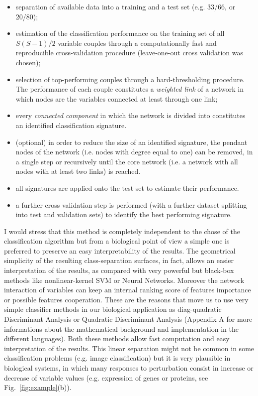 \documentclass{standalone}
\begin{document}
\begin{itemize}

\item separation of available data into a training and a test set (e.g. 33/66, or 20/80);

\item estimation of the classification performance on the training set of all $S(S-1)/2$ variable couples through a computationally fast and reproducible cross-validation procedure (leave-one-out cross validation was chosen);

\item selection of top-performing couples through a hard-thresholding procedure.
The performance of each couple constitutes a \emph{weighted link} of a network in which nodes are the variables connected at least through one link;

\item every \emph{connected component} in which the network is divided into constitutes an identified classification signature.

\item (optional) in order to reduce the size of an identified signature, the pendant nodes of the network (i.e. nodes with degree equal to one) can be removed, in a single step or recursively until the core network (i.e. a network with all nodes with at least two links) is reached.

\item all signatures are applied onto the test set to estimate their performance.

\item a further cross validation step is performed (with a further dataset splitting into test and validation sets) to identify the best performing signature.

\end{itemize}

I would stress that this method is completely independent to the chose of the classification algorithm but from a biological point of view a simple one is preferred to preserve an easy interpretability of the results.
The geometrical simplicity of the resulting class-separation surfaces, in fact, allows an easier interpretation of the results, as compared with very powerful but black-box methods like nonlinear-kernel SVM or Neural Networks.
Moreover the network interaction of variables can keep an internal ranking score of features importance or possible features cooperation.
These are the reasons that move us to use very simple classifier methods in our biological application as diag-quadratic Discriminant Analysis or Quadratic Discriminant Analysis (Appendix A for more informations about the mathematical background and implementation in the different languages).
Both these methods allow fast computation and easy interpretation of the results.
This linear separation might not be common in some classification problems (e.g. image classification) but it is very plausible in biological systems, in which many responses to perturbation consist in increase or decrease of variable values (e.g. expression of genes or proteins, see Fig.~\ref{fig:example}(b)).
\end{document}
